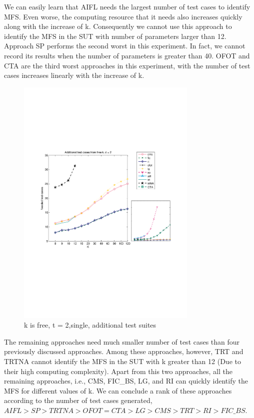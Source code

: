 \documentclass{sig-alternate-05-2015}
\begin{document}
{{{{We can easily learn that AIFL needs the largest number of test cases to identify MFS. Even worse, the computing resource that it needs also increases quickly along with the increase of k. Consequently we cannot use this approach to identify the MFS in the SUT with number of parameters larger than 12. Approach SP performs the second worst in this experiment. In fact, we cannot record its results when the number of parameters is greater than 40. OFOT and CTA are the third worst approaches in this experiment, with the number of test cases increases linearly with the increase of k.

\begin{figure}
 \centering
 \includegraphics[width=3.4in]{cpp.pdf}
 \caption{k is free, t = 2,single, additional test suites}
 \label{fig_free_k}
\end{figure}

The remaining approaches need much smaller number of test cases than four previously discussed approaches. Among these approaches, however, TRT and TRTNA cannot identify the MFS in the SUT with k greater than 12 (Due to their high computing complexity). Apart from this two approaches, all the remaining approaches, i.e., CMS, FIC\_BS, LG, and RI can quickly identify the MFS for different values of k. We can conclude a rank of these approaches according to the number of test cases generated, $AIFL > SP > TRTNA > OFOT = CTA > LG > CMS > TRT > RI > FIC\_BS$.


}}}}
\end{document}
